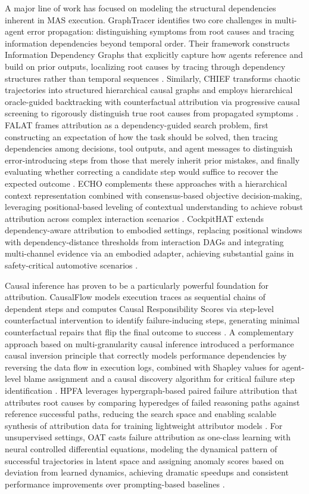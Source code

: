 \documentclass[11pt]{article}
\begin{document}
A major line of work has focused on modeling the structural dependencies inherent in MAS execution. GraphTracer identifies two core challenges in multi-agent error propagation: distinguishing symptoms from root causes and tracing information dependencies beyond temporal order. Their framework constructs Information Dependency Graphs that explicitly capture how agents reference and build on prior outputs, localizing root causes by tracing through dependency structures rather than temporal sequences \cite{ref366}. Similarly, CHIEF transforms chaotic trajectories into structured hierarchical causal graphs and employs hierarchical oracle-guided backtracking with counterfactual attribution via progressive causal screening to rigorously distinguish true root causes from propagated symptoms \cite{ref367}. FALAT frames attribution as a dependency-guided search problem, first constructing an expectation of how the task should be solved, then tracing dependencies among decisions, tool outputs, and agent messages to distinguish error-introducing steps from those that merely inherit prior mistakes, and finally evaluating whether correcting a candidate step would suffice to recover the expected outcome \cite{ref368}. ECHO complements these approaches with a hierarchical context representation combined with consensus-based objective decision-making, leveraging positional-based leveling of contextual understanding to achieve robust attribution across complex interaction scenarios \cite{ref369}. CockpitHAT extends dependency-aware attribution to embodied settings, replacing positional windows with dependency-distance thresholds from interaction DAGs and integrating multi-channel evidence via an embodied adapter, achieving substantial gains in safety-critical automotive scenarios \cite{ref370}.

Causal inference has proven to be a particularly powerful foundation for attribution. CausalFlow models execution traces as sequential chains of dependent steps and computes Causal Responsibility Scores via step-level counterfactual intervention to identify failure-inducing steps, generating minimal counterfactual repairs that flip the final outcome to success \cite{ref371}. A complementary approach based on multi-granularity causal inference introduced a performance causal inversion principle that correctly models performance dependencies by reversing the data flow in execution logs, combined with Shapley values for agent-level blame assignment and a causal discovery algorithm for critical failure step identification \cite{ref372}. HPFA leverages hypergraph-based paired failure attribution that attributes root causes by comparing hyperedges of failed reasoning paths against reference successful paths, reducing the search space and enabling scalable synthesis of attribution data for training lightweight attributor models \cite{ref373}. For unsupervised settings, OAT casts failure attribution as one-class learning with neural controlled differential equations, modeling the dynamical pattern of successful trajectories in latent space and assigning anomaly scores based on deviation from learned dynamics, achieving dramatic speedups and consistent performance improvements over prompting-based baselines \cite{ref374}.
\end{document}
